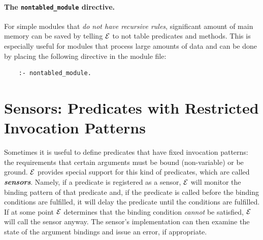 \documentclass[11pt]{article}
\newcommand{\ERGO}{\mbox{\ensuremath{\cal{E}}\smaller{{\sc{RGO}}}}\xspace}
\newcommand{\FLSYSTEM}{\ERGO}
\begin{document}
\paragraph{The \texttt{nontabled\_module}  directive.}
For simple modules that \emph{do not have recursive rules}, significant
amount of main memory can be saved by telling \FLSYSTEM to not table
predicates and methods.  This is especially useful for modules that process
large amounts of data and can be done by placing the following directive
in the module file:
\begin{verbatim}
    :- nontabled_module.
\end{verbatim}


\section{Sensors: Predicates with Restricted Invocation Patterns}\label{sec-sensor}

Sometimes it is useful to define predicates that have fixed
invocation patterns: the requirements that certain arguments must be
bound (non-variable) or be ground.
\FLSYSTEM provides special support for this kind of predicates, which are
called \textbf{\emph{sensors}}. Namely, if a predicate is registered as a
sensor,
\FLSYSTEM will monitor the binding pattern of that predicate and, if the
predicate is called before the binding conditions are fulfilled, it will
delay the predicate until the conditions
are fulfilled. If  at some point \FLSYSTEM determines that
the binding condition \emph{cannot} be satisfied, \FLSYSTEM will call the sensor
anyway. The sensor's implementation
can then examine the state of the argument bindings and
issue an error, if appropriate.
\end{document}
